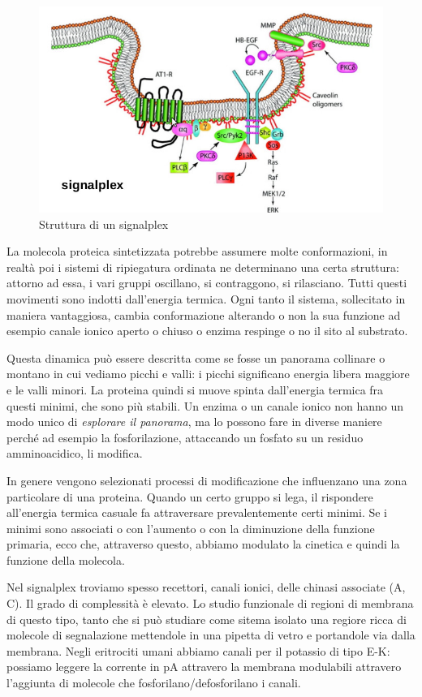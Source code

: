 \documentclass[a4paper,12pt]{article}
\begin{document}
\begin{figure}[H]
\centering
\includegraphics[scale=0.4]{immagine/plex.jpg}
\caption{Struttura di un signalplex}
\end{figure}

La molecola proteica sintetizzata potrebbe assumere molte conformazioni, in realtà poi i sistemi di ripiegatura ordinata ne determinano una certa struttura: attorno ad essa, i vari gruppi oscillano, si contraggono, si rilasciano. Tutti questi movimenti sono indotti dall'energia termica.
Ogni tanto il sistema, sollecitato in maniera vantaggiosa, cambia conformazione alterando o non la sua funzione ad esempio canale ionico aperto o chiuso o enzima respinge o no il sito al substrato.

Questa dinamica può essere descritta come se fosse un panorama collinare o montano in cui vediamo picchi e valli: i picchi significano energia libera maggiore e le valli minori. La proteina quindi si muove spinta dall'energia termica fra questi minimi, che sono più stabili. Un enzima o un canale ionico non hanno un modo unico di \emph{esplorare il panorama}, ma lo possono fare in diverse maniere perché ad esempio la fosforilazione, attaccando un fosfato su un residuo amminoacidico, li modifica.

In genere vengono selezionati processi di modificazione che influenzano una zona particolare di una proteina. Quando un certo gruppo si lega, il rispondere all'energia termica casuale fa attraversare prevalentemente certi minimi. Se i minimi sono associati o con l'aumento o con la diminuzione della funzione primaria, ecco che, attraverso questo, abbiamo modulato la cinetica e quindi la funzione della molecola.

Nel signalplex troviamo spesso recettori, canali ionici, delle chinasi associate (A, C). Il grado di complessità è elevato. Lo studio funzionale di regioni di membrana di questo tipo, tanto che si può studiare come sitema isolato una regiore ricca di molecole di segnalazione mettendole in una pipetta di vetro e portandole via dalla membrana. Negli eritrociti umani abbiamo canali per il potassio di tipo E-K: possiamo leggere la corrente in pA attravero la membrana modulabili attravero l'aggiunta di molecole che fosforilano/defosforilano i canali.
\end{document}
